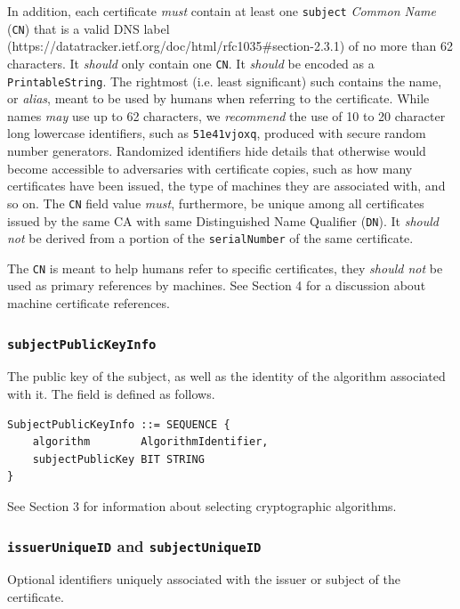 In addition, each certificate \textit{must} contain at least one \texttt{subject} \textit{Common Name} (\texttt{CN}) that is a valid DNS label (https://datatracker.ietf.org/doc/html/rfc1035\#section-2.3.1) of no more than 62 characters.
It \textit{should} only contain one \texttt{CN}.
It \textit{should} be encoded as a \texttt{PrintableString}.
The rightmost (i.e. least significant) such contains the name, or \textit{alias}, meant to be used by humans when referring to the certificate.
While names \textit{may} use up to 62 characters, we \textit{recommend} the use of 10 to 20 character long lowercase identifiers, such as \texttt{51e41vjoxq}, produced with secure random number generators.
Randomized identifiers hide details that otherwise would become accessible to adversaries with certificate copies, such as how many certificates have been issued, the type of machines they are associated with, and so on.
The \texttt{CN} field value \textit{must}, furthermore, be unique among all certificates issued by the same CA with same Distinguished Name Qualifier (\texttt{DN}).
It \textit{should not} be derived from a portion of the \texttt{serialNumber} of the same certificate.

The \texttt{CN} is meant to help humans refer to specific certificates, they \textit{should not} be used as primary references by machines.
See Section 4 for a discussion about machine certificate references.

\subsubsection{\texttt{subjectPublicKeyInfo}}

The public key of the subject, as well as the identity of the algorithm associated with it.
The field is defined as follows.

\begin{verbatim}
SubjectPublicKeyInfo ::= SEQUENCE {
    algorithm        AlgorithmIdentifier,
    subjectPublicKey BIT STRING
}
\end{verbatim}

See Section 3 for information about selecting cryptographic algorithms.

\subsubsection{\texttt{issuerUniqueID} and \texttt{subjectUniqueID}}

Optional identifiers uniquely associated with the issuer or subject of the certificate.

